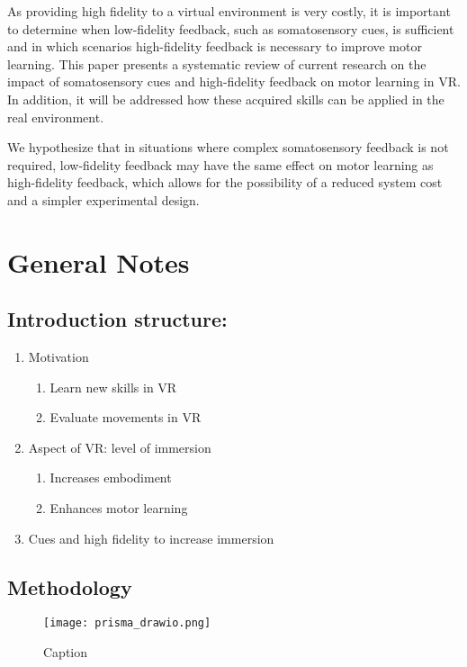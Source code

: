 \documentclass[conference]{IEEEtran}
\begin{document}
As providing high fidelity to a virtual environment is very costly, it is important to determine when low-fidelity feedback, such as somatosensory cues, is sufficient and in which scenarios high-fidelity feedback is necessary to improve motor learning. This paper presents a systematic review of current research on the impact of somatosensory cues and high-fidelity feedback on motor learning in VR. In addition, it will be addressed how these acquired skills can be applied in the real environment.

We hypothesize that in situations where complex somatosensory feedback is not required, low-fidelity feedback may have the same effect on motor learning as high-fidelity feedback, which allows for the possibility of a reduced system cost and a simpler experimental design.


\section{General Notes}

\subsection{Introduction structure:}
\begin{enumerate}
    \item Motivation
    \begin{enumerate}
        \item Learn new skills in VR
        \item Evaluate movements in VR
    \end{enumerate}
    \item Aspect of VR: level of immersion
    \begin{enumerate}
        \item Increases embodiment
        \item Enhances motor learning 
    \end{enumerate} 
    \item Cues and high fidelity to increase immersion
\end{enumerate}
\vspace{5mm}

\subsection{Methodology}
\begin{figure}
    \centering
    \texttt{[image: prisma\_drawio.png]}
    \caption{Caption}
    \label{fig:enter-label}
\end{figure}
\end{document}
